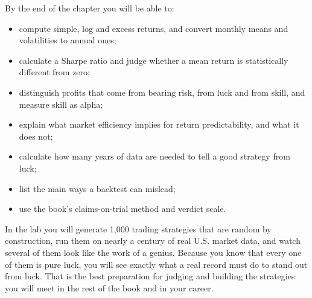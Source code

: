 By the end of the chapter you will be able to:

\begin{itemize}
  \item compute simple, log and excess returns, and convert monthly means and volatilities to annual ones;
  \item calculate a Sharpe ratio and judge whether a mean return is statistically different from zero;
  \item distinguish profits that come from bearing risk, from luck and from skill, and measure skill as alpha;
  \item explain what market efficiency implies for return predictability, and what it does not;
  \item calculate how many years of data are needed to tell a good strategy from luck;
  \item list the main ways a backtest can mislead;
  \item use the book's claims-on-trial method and verdict scale.
\end{itemize}

In the lab you will generate 1,000 trading strategies that are random by construction, run them on nearly a century of real U.S. market data, and watch several of them look like the work of a genius. Because you know that every one of them is pure luck, you will see exactly what a real record must do to stand out from luck. That is the best preparation for judging and building the strategies you will meet in the rest of the book and in your career.

